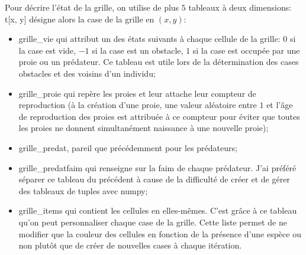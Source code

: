 \documentclass[11pt]{article}
\begin{document}
Pour décrire l'état de la grille, on utilise de plus $5$ tableaux à deux dimensions: \textsf{t[x, y]} désigne alors la case de la grille en $(x, y)$:
\begin{itemize}[label=\textbullet]
    \item \textsf{grille\_vie} qui attribut un des états suivants à chaque cellule de la grille: $0$ si la case est vide, $-1$ si la case est un obstacle, $1$ si la case est occupée par une proie ou un prédateur. Ce tableau est utile lors de la détermination des cases obstacles et des voisins d'un individu;
    \item \textsf{grille\_proie} qui repère les proies et leur attache leur compteur de reproduction (à la création d'une proie, une valeur aléatoire entre $1$ et l'âge de reproduction des proies est attribuée à ce compteur pour éviter que toutes les proies ne donnent simultanément naissance à une nouvelle proie);
    \item \textsf{grille\_predat}, pareil que précédemment pour les prédateurs;
    \item \textsf{grille\_predatfaim} qui renseigne sur la faim de chaque prédateur. J'ai préféré séparer ce tableau du précédent à cause de la difficulté de créer et de gérer des tableaux de tuples avec \textsf{numpy};
    \item \textsf{grille\_items} qui contient les cellules en elles-mêmes. C'est grâce à ce tableau qu'on peut personnaliser chaque case de la grille. Cette liste permet de ne modifier que la couleur des cellules en fonction de la présence d'une espèce ou non plutôt que de créer de nouvelles cases à chaque itération.
\end{itemize}
\end{document}

